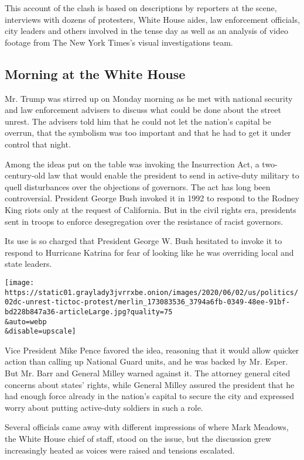 This account of the clash is based on descriptions by reporters at the
scene, interviews with dozens of protesters, White House aides, law
enforcement officials, city leaders and others involved in the tense day
as well as an analysis of video footage from The New York Times's visual
investigations team.

\hypertarget{morning-at-the-white-house}{%
\subsection{Morning at the White
House}\label{morning-at-the-white-house}}

Mr. Trump was stirred up on Monday morning as he met with national
security and law enforcement advisers to discuss what could be done
about the street unrest. The advisers told him that he could not let the
nation's capital be overrun, that the symbolism was too important and
that he had to get it under control that night.

Among the ideas put on the table was invoking the Insurrection Act, a
two-century-old law that would enable the president to send in
active-duty military to quell disturbances over the objections of
governors. The act has long been controversial. President George Bush
invoked it in 1992 to respond to the Rodney King riots only at the
request of California. But in the civil rights era, presidents sent in
troops to enforce desegregation over the resistance of racist governors.

Its use is so charged that President George W. Bush hesitated to invoke
it to respond to Hurricane Katrina for fear of looking like he was
overriding local and state leaders.

\texttt{[image: https://static01.graylady3jvrrxbe.onion/images/2020/06/02/us/politics/02dc-unrest-tictoc-protest/merlin\_173083536\_3794a6fb-0349-48ee-91bf-bd228b847a36-articleLarge.jpg?quality=75\\\&auto=webp\\\&disable=upscale]}

Vice President Mike Pence favored the idea, reasoning that it would
allow quicker action than calling up National Guard units, and he was
backed by Mr. Esper. But Mr. Barr and General Milley warned against it.
The attorney general cited concerns about states' rights, while General
Milley assured the president that he had enough force already in the
nation's capital to secure the city and expressed worry about putting
active-duty soldiers in such a role.

Several officials came away with different impressions of where Mark
Meadows, the White House chief of staff, stood on the issue, but the
discussion grew increasingly heated as voices were raised and tensions
escalated.

